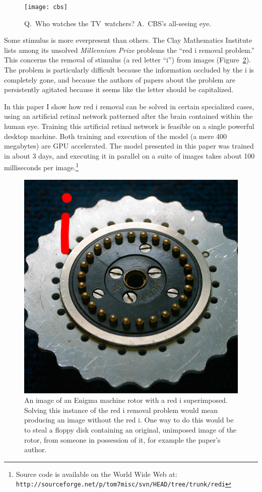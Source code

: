 \documentclass[twocolumn]{article}
\begin{document}
\begin{figure}[t]
\begin{center}
\texttt{[image: cbs]}
\end{center}
\caption{Q.~Who watches the TV~watchers?
A.~CBS's all-seeing eye.} \label{fig:cbs}
\end{figure}

Some stimulus is more everpresent than others. The Clay Mathematics
Institute lists among its unsolved {\em Millennium Prize} problems the
``red i removal problem.'' This concerns the removal of stimulus (a
red letter ``i'') from images (Figure~\ref{fig:redi}). The problem
is particularly difficult because the information occluded by the
i is completely gone, and because the authors of papers about the
problem are persistently agitated because it seems like the letter
should be capitalized.

In this paper I show how red i removal can be solved in certain
specialized cases, using an artificial retinal network patterned after
the brain contained within the human eye. Training this artificial
retinal network is feasible on a single powerful desktop machine. Both
training and execution of the model (a mere 400 megabytes) are GPU
accelerated. The model presented in this paper was trained in about 3
days, and executing it in parallel on a suite of images takes about
100 milliseconds per image.\!\footnote{Source code is available on
the World Wide Web at:
{\tt http://sourceforge.net/p/tom7misc/svn/HEAD/tree/trunk/redi}}

\begin{figure}[tb]
\begin{center}
\includegraphics[width=0.65 \linewidth]{rotor}
\end{center}
\caption{An image of an Enigma machine rotor with a red i
 superimposed. Solving this instance of the red i removal problem
 would mean producing an image without the red i. One way to do this
 would be to steal a floppy disk containing an original, unimposed
 image of the rotor, from someone in possession of it, for example
 the paper's author.} \label{fig:redi}
\end{figure}
\end{document}

